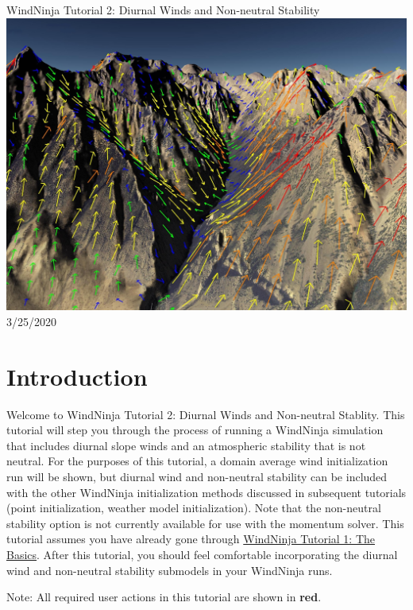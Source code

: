 \documentclass[12pt]{article}
\begin{document}
\begin{titlepage}
    \centering
    {\Huge
       WindNinja Tutorial 2: Diurnal Winds and Non-neutral Stability
    }    
    \vfill
    \includegraphics[scale=0.2]								{imgs/title_fig.jpg}
    \vfill
  	{\Huge
	  3/25/2020 %
  	}
    \vfill
\end{titlepage}

\section*{Introduction}
Welcome to WindNinja Tutorial 2: Diurnal Winds and Non-neutral Stablity.  This tutorial will step you through the process of running a WindNinja simulation that includes diurnal slope winds and an atmospheric stability that is not neutral.  For the purposes of this tutorial, a domain average wind initialization run will be shown, but diurnal wind and non-neutral stability can be included with the other WindNinja initialization methods discussed in subsequent tutorials (point initialization, weather model initialization).  Note that the non-neutral stability option is not currently available for use with the momentum solver. This tutorial assumes you have already gone through \href{https://weather.firelab.org/windninja/tutorials/WindNinja_tutorial1.pdf}{WindNinja Tutorial 1: The Basics}.  After this tutorial, you should feel comfortable incorporating the diurnal wind and non-neutral stability submodels in your WindNinja runs.

Note:  All required user actions in this tutorial are shown in  \textbf{\color{red} red}.
\end{document}

